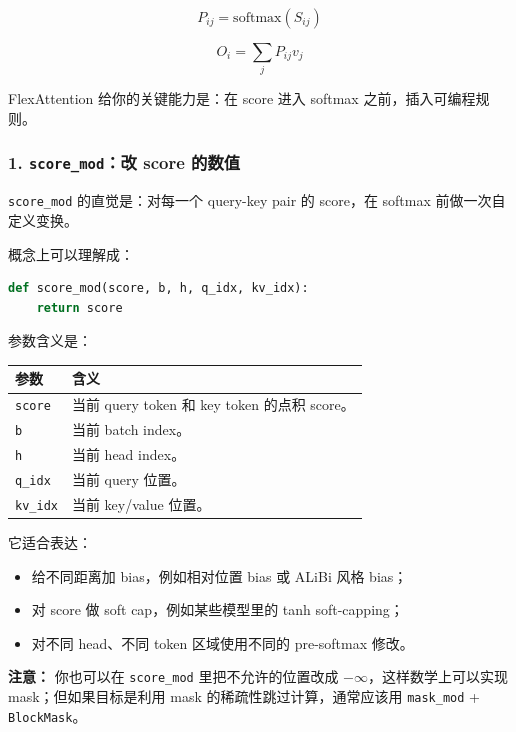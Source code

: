 \[
P_{ij}=\mathrm{softmax}(S_{ij})
\]

\[
O_i=\sum_j P_{ij}v_j
\]

FlexAttention 给你的关键能力是：在 score 进入 softmax 之前，插入可编程规则。

\subsubsection*{1. \texttt{score\_mod}：改 score 的数值}

\texttt{score\_mod} 的直觉是：对每一个 query-key pair 的 score，在 softmax 前做一次自定义变换。

概念上可以理解成：

\begin{lstlisting}[language=Python]
def score_mod(score, b, h, q_idx, kv_idx):
    return score
\end{lstlisting}

参数含义是：

\begin{center}
{\small
\begin{tabular}{p{2.3cm}p{10.2cm}}
\hline
\textbf{参数} & \textbf{含义} \\
\hline
\texttt{score} & 当前 query token 和 key token 的点积 score。 \\
\texttt{b} & 当前 batch index。 \\
\texttt{h} & 当前 head index。 \\
\texttt{q\_idx} & 当前 query 位置。 \\
\texttt{kv\_idx} & 当前 key/value 位置。 \\
\hline
\end{tabular}
}
\end{center}

它适合表达：

\begin{itemize}[leftmargin=1.5em]
  \item 给不同距离加 bias，例如相对位置 bias 或 ALiBi 风格 bias；
  \item 对 score 做 soft cap，例如某些模型里的 tanh soft-capping；
  \item 对不同 head、不同 token 区域使用不同的 pre-softmax 修改。
\end{itemize}

\begin{warnbox}
\textbf{注意：} 你也可以在 \texttt{score\_mod} 里把不允许的位置改成 $-\infty$，这样数学上可以实现 mask；但如果目标是利用 mask 的稀疏性跳过计算，通常应该用 \texttt{mask\_mod} + \texttt{BlockMask}。
\end{warnbox}


